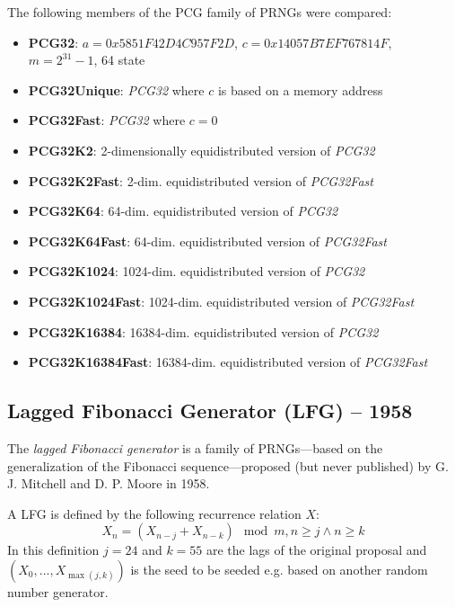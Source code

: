     The following members of the PCG family of PRNGs were compared:
    \begin{itemize}
		\itemsep0em
        \item \textbf{PCG32}:           $a = 0x5851F42D4C957F2D$, $c = 0x14057B7EF767814F$, $m = 2^{31} - 1$, \SI{64}{\bit} state
        \item \textbf{PCG32Unique}:     \textit{PCG32} where $c$ is based on a memory address
        \item \textbf{PCG32Fast}:       \textit{PCG32} where $c = 0$
        \item \textbf{PCG32K2}:         2-dimensionally equidistributed version of \textit{PCG32}
        \item \textbf{PCG32K2Fast}:     2-dim. equidistributed version of \textit{PCG32Fast}
        \item \textbf{PCG32K64}:        64-dim. equidistributed version of \textit{PCG32}
        \item \textbf{PCG32K64Fast}:    64-dim. equidistributed version of \textit{PCG32Fast}
        \item \textbf{PCG32K1024}:      1024-dim. equidistributed version of \textit{PCG32}
        \item \textbf{PCG32K1024Fast}:  1024-dim. equidistributed version of \textit{PCG32Fast}
        \item \textbf{PCG32K16384}:     16384-dim. equidistributed version of \textit{PCG32}
        \item \textbf{PCG32K16384Fast}: 16384-dim. equidistributed version of \textit{PCG32Fast}
    \end{itemize}

\subsection[Lagged Fibonacci Generator (LFG) -- 1958]{Lagged Fibonacci Generator (LFG) -- 1958} \label{subsec:lfg}

    The \emph{lagged Fibonacci generator} is a family of PRNGs---based on the generalization of the Fibonacci sequence---proposed (but never published) by G. J. Mitchell and D. P. Moore in 1958.

    A LFG is defined by the following recurrence relation $X$:
    \begin{equation*}
        X_n = \left(X_{n - j} + X_{n - k}\right) \mod m, n \geq j \land n \geq k
    \end{equation*}
    In this definition $j = 24$ and $k = 55$ are the lags of the original proposal and $\left(X_0, ..., X_{\max\left(j, k\right)}\right)$ is the seed to be seeded e.g. based on another random number generator.

